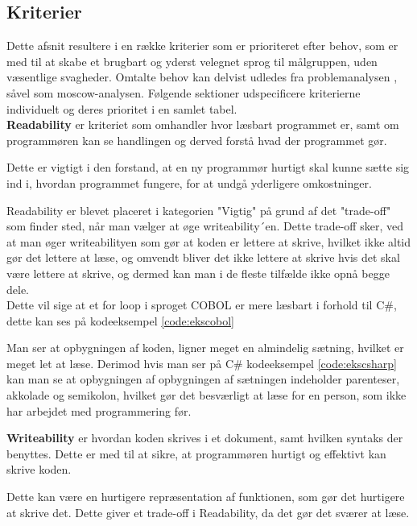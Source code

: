 \subsection{Kriterier}
Dette afsnit resultere i en række kriterier som er prioriteret efter behov, som er med til at skabe et brugbart og yderst velegnet sprog til målgruppen, uden væsentlige svagheder. Omtalte behov kan delvist udledes fra problemanalysen , såvel som \gls{moscow}-analysen.
Følgende sektioner udspecificere kriterierne individuelt og deres prioritet i en samlet tabel.\\

\noindent\textbf{Readability} er kriteriet som omhandler hvor læsbart programmet er, samt om programmøren kan se handlingen og derved forstå hvad der programmet gør.

Dette er vigtigt i den forstand, at en ny programmør hurtigt skal kunne sætte sig ind i, hvordan programmet fungere, for at undgå yderligere omkostninger. 

Readability er blevet placeret i kategorien "Vigtig" på grund af det "trade-off" som finder sted, når man vælger at øge writeability´en.
Dette trade-off sker, ved at man øger writeabilityen som gør at koden er lettere at skrive, hvilket ikke altid gør det lettere at læse, og omvendt bliver det ikke lettere at skrive hvis det skal være lettere at skrive, og dermed kan man i de fleste tilfælde ikke opnå begge dele.
\\
Dette vil sige at et for loop i sproget COBOL er mere læsbart i forhold til C\#, dette kan ses på kodeeksempel \ref{code:ekscobol}


\noindent Man ser at opbygningen af koden, ligner meget en almindelig sætning, hvilket er meget let at læse. Derimod hvis man ser på C\# kodeeksempel \ref{code:ekscsharp} kan man se at opbygningen af opbygningen af sætningen indeholder parenteser, akkolade og semikolon, hvilket gør det besværligt at læse for en person, som ikke har arbejdet med programmering før.



\noindent\textbf{Writeability} er hvordan koden skrives i et dokument, samt hvilken syntaks der benyttes. Dette er med til at sikre, at programmøren hurtigt og effektivt kan skrive koden.

Dette kan være en hurtigere repræsentation af funktionen, som gør det hurtigere at skrive det. Dette giver et trade-off i Readability, da det gør det sværer at læse.\\

